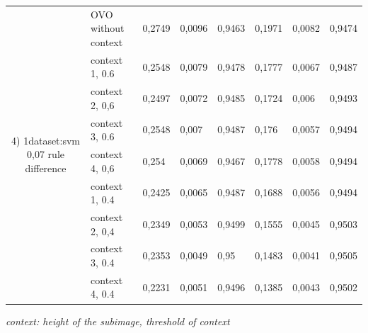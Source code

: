 \documentclass{siamart171218}
\begin{document}
\begin{appendices}
\begin{table}[H]
{\begin{tabular}{|cl|lll|lll|}
\multicolumn{1}{|c|}{\multirow{9}{*}{4) 1dataset:svm 0,07 rule difference}} & OVO   without context & \multicolumn{1}{l|}{0,2749} & \multicolumn{1}{l|}{0,0096} & 0,9463 & \multicolumn{1}{l|}{0,1971} & \multicolumn{1}{l|}{0,0082} & 0,9474 \\ \cline{2-8} 
\multicolumn{1}{|c|}{} & context 1, 0.6 & \multicolumn{1}{l|}{0,2548} & \multicolumn{1}{l|}{0,0079} & 0,9478 & \multicolumn{1}{l|}{0,1777} & \multicolumn{1}{l|}{0,0067} & 0,9487 \\ \cline{2-8} 
\multicolumn{1}{|c|}{} & context 2, 0,6 & \multicolumn{1}{l|}{0,2497} & \multicolumn{1}{l|}{0,0072} & 0,9485 & \multicolumn{1}{l|}{0,1724} & \multicolumn{1}{l|}{0,006} & 0,9493 \\ \cline{2-8} 
\multicolumn{1}{|c|}{} & context 3, 0.6 & \multicolumn{1}{l|}{0,2548} & \multicolumn{1}{l|}{0,007} & 0,9487 & \multicolumn{1}{l|}{0,176} & \multicolumn{1}{l|}{0,0057} & 0,9494 \\ \cline{2-8} 
\multicolumn{1}{|c|}{} & context 4, 0,6 & \multicolumn{1}{l|}{0,254} & \multicolumn{1}{l|}{0,0069} & 0,9467 & \multicolumn{1}{l|}{0,1778} & \multicolumn{1}{l|}{0,0058} & 0,9494 \\ \cline{2-8} 
\multicolumn{1}{|c|}{} & context 1, 0.4 & \multicolumn{1}{l|}{0,2425} & \multicolumn{1}{l|}{0,0065} & 0,9487 & \multicolumn{1}{l|}{0,1688} & \multicolumn{1}{l|}{0,0056} & 0,9494 \\ \cline{2-8} 
\multicolumn{1}{|c|}{} & context 2, 0,4 & \multicolumn{1}{l|}{0,2349} & \multicolumn{1}{l|}{0,0053} & 0,9499 & \multicolumn{1}{l|}{0,1555} & \multicolumn{1}{l|}{0,0045} & 0,9503 \\ \cline{2-8} 
\multicolumn{1}{|c|}{} & context 3, 0.4 & \multicolumn{1}{l|}{0,2353} & \multicolumn{1}{l|}{0,0049} & 0,95 & \multicolumn{1}{l|}{0,1483} & \multicolumn{1}{l|}{0,0041} & 0,9505 \\ \cline{2-8} 
\multicolumn{1}{|c|}{} & context 4, 0.4 & \multicolumn{1}{l|}{0,2231} & \multicolumn{1}{l|}{0,0051} & 0,9496 & \multicolumn{1}{l|}{0,1385} & \multicolumn{1}{l|}{0,0043} & 0,9502 \\ \hline
\end{tabular}%
}
\end{table}

\textit {context: height of the subimage, threshold of context } 


\end{appendices}
\end{document}
